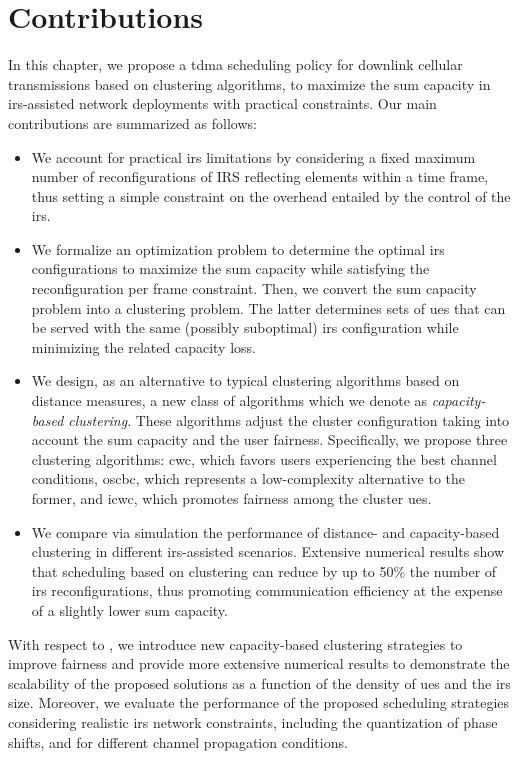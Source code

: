 \section{Contributions}
In this chapter, we propose a \gls{tdma} scheduling policy for downlink cellular transmissions based on clustering algorithms, to maximize the sum capacity in \gls{irs}-assisted network deployments with practical constraints.
Our main contributions are summarized as follows:
\begin{itemize}%
    \item We account for practical \gls{irs} limitations by considering a fixed maximum number of reconfigurations of IRS reflecting elements within a time frame, thus setting a simple constraint on the overhead entailed by the control of the \gls{irs}.
    \item We formalize an optimization problem to determine the optimal \gls{irs} configurations to maximize the sum capacity while satisfying the reconfiguration per frame constraint. Then, we convert the sum capacity problem into a clustering problem. The latter determines sets of \glspl{ue} that can be served with the same (possibly suboptimal) \gls{irs} configuration while minimizing the related capacity loss. %
    \item We design, as an alternative to typical clustering algorithms based on distance measures, a new class of algorithms which we denote as \textit{capacity-based clustering}. These algorithms adjust the cluster configuration taking into account the sum capacity and the user fairness.
     Specifically, we propose three clustering algorithms: \gls{cwc}, which favors users experiencing the best channel conditions, %
     \gls{oscbc}, which represents a low-complexity alternative to the former, and \gls{icwc}, which promotes fairness among the cluster \glspl{ue}.
    \item We compare via simulation the performance of distance- and capacity-based clustering in different \gls{irs}-assisted scenarios.
    Extensive numerical results show that scheduling based on clustering can reduce by up to 50\% the number of \gls{irs} reconfigurations, thus promoting communication efficiency at the expense of a slightly lower sum capacity. 
\end{itemize}
With respect to \cite{rech2023downlink}, we introduce new capacity-based clustering strategies to improve fairness and provide more extensive numerical results to demonstrate the scalability of the proposed solutions as a function of the density of \glspl{ue} and the \gls{irs} size. Moreover, we evaluate the performance of the proposed scheduling strategies considering realistic \gls{irs} network constraints, including the quantization of phase shifts, and for different channel propagation conditions.
